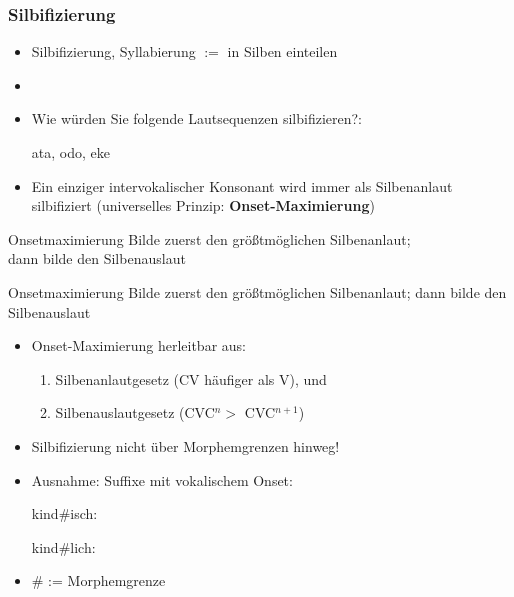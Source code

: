 \begin{frame}
\frametitle{Silbifizierung}

\begin{itemize}
	\item Silbifizierung, Syllabierung $:=$ in Silben einteilen
	\item[]
	\item Wie würden Sie folgende Lautsequenzen silbifizieren?:

	  \ea
          ata, odo, eke
          \z

\pause

	\item Ein einziger intervokalischer Konsonant wird immer als Silbenanlaut silbifiziert (universelles Prinzip: \textbf{Onset-Maximierung})
	
	
\end{itemize}

\begin{block}{Onsetmaximierung}
Bilde zuerst den größtmöglichen Silbenanlaut;\\ dann bilde den Silbenauslaut \citep[218]{Hall00a}
\end{block}

\end{frame}




\begin{frame}

\begin{block}{Onsetmaximierung}
Bilde zuerst den größtmöglichen Silbenanlaut; dann bilde den Silbenauslaut \citep[218]{Hall00a}
\end{block}


\begin{itemize}
	\item Onset-Maximierung herleitbar aus:
	\begin{enumerate}
		\item Silbenanlautgesetz (CV häufiger als V), und
		\item Silbenauslautgesetz (CVC$^{n} >$ CVC$^{n+1}$)
	\end{enumerate}

\pause
	\item Silbifizierung nicht über Morphemgrenzen hinweg! 
	\item Ausnahme: Suffixe mit vokalischem Onset:
	
	  \ea
          kind\#isch: 
          \z
	
	  \ea
          kind\#lich: \textipa{[kInt.lI\c{c}]}
          \z
          
     \item \# := Morphemgrenze


	
\end{itemize}

\end{frame}


